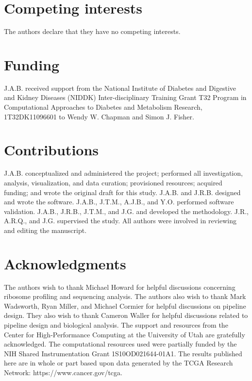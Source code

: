 \documentclass[11pt, a4paper, oneside]{article}
\newcommand{\beginsupplement}{%
  \setcounter{table}{0}
  \renewcommand{\thetable}{S\arabic{table}}%
  \setcounter{figure}{0}
  \renewcommand{\thefigure}{S\arabic{figure}}%
}
\begin{document}
\section*{Competing interests}
The authors declare that they have no competing interests.

\section*{Funding}
J.A.B. received support from the National Institute of Diabetes and Digestive and Kidney Diseases (NIDDK) Inter-disciplinary Training Grant T32 Program in Computational Approaches to Diabetes and Metabolism Research, 1T32DK11096601 to Wendy W. Chapman and Simon J. Fisher.

\section*{Contributions}
J.A.B. conceptualized and administered the project; performed all investigation, analysis, visualization, and data curation; provisioned resources; acquired funding; and wrote the original draft for this study. J.A.B. and J.R.B. designed and wrote the software. J.A.B., J.T.M., A.J.B., and Y.O. performed software validation. J.A.B., J.R.B., J.T.M., and J.G. and developed the methodology. J.R., A.R.Q., and J.G. supervised the study. All authors were involved in reviewing and editing the manuscript.

\section*{Acknowledgments}
The authors wish to thank Michael Howard for helpful discussions concerning ribosome profiling and sequencing analysis. The authors also wish to thank Mark Wadsworth, Ryan Miller, and Michael Cormier for helpful discussions on pipeline design. They also wish to thank Cameron Waller for helpful discussions related to pipeline design and biological analysis. The support and resources from the Center for High-Performance Computing at the University of Utah are gratefully acknowledged. The computational resources used were partially funded by the NIH Shared Instrumentation Grant 1S10OD021644-01A1. The results published here are in whole or part based upon data generated by the TCGA Research Network: https://www.cancer.gov/tcga.





\beginsupplement
\end{document}
